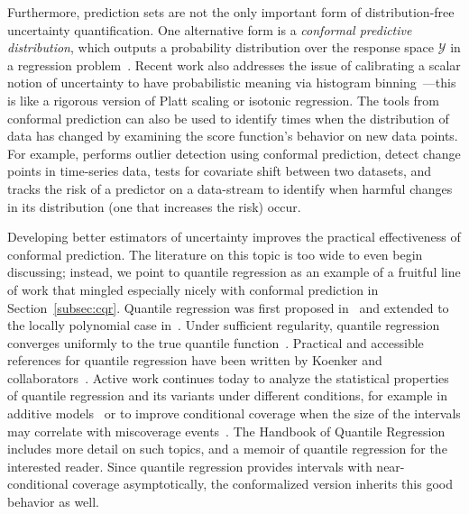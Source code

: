 \documentclass[10pt]{article}
\newcommand{\Y}{\mathcal{Y}}
\begin{document}
Furthermore, prediction sets are not the only important form of distribution-free uncertainty quantification.
One alternative form is a \emph{conformal predictive distribution}, which outputs a probability distribution over the response space $\Y$ in a regression problem~\cite{vovk2017nonparametric}.
Recent work also addresses the issue of calibrating a scalar notion of uncertainty to have probabilistic meaning via histogram binning~\cite{gupta2021distribution, park2021pac}---this is like a rigorous version of Platt scaling or isotonic regression.
The tools from conformal prediction can also be used to identify times when the distribution of data has changed by examining the score function's behavior on new data points.
For example, \cite{bates2021multiple} performs outlier detection using conformal prediction, \cite{vovk2021testing,volkhonskiy2017inductive} detect change points in time-series data, \cite{hu2020distributionfree} tests for covariate shift between two datasets, and \cite{podkopaev2021tracking} tracks the risk of a predictor on a data-stream to identify when harmful changes in its distribution (one that increases the risk) occur.

Developing better estimators of uncertainty improves the practical effectiveness of conformal prediction.
The literature on this topic is too wide to even begin discussing; instead, we point to quantile regression as an example of a fruitful line of work that mingled especially nicely with conformal prediction in Section~\ref{subsec:cqr}.
Quantile regression was first proposed in~\cite{koenker1978regression} and extended to the locally polynomial case in~\cite{chaudhuri1991global}.
Under sufficient regularity, quantile regression converges uniformly to the true quantile function~\cite{chaudhuri1991global,steinwart2011estimating,takeuchi2006nonparametric, zhou1996direct,zhou1998statistical}.
Practical and accessible references for quantile regression have been written by Koenker and collaborators~\cite{koenker2005quantile,koenker2018handbook}.
Active work continues today to analyze the statistical properties of quantile regression and its variants under different conditions, for example in additive models~\cite{koenker2011additive} or to improve conditional coverage when the size of the intervals may correlate with miscoverage events~\cite{feldman2021improving}.
The Handbook of Quantile Regression~\cite{koenker2018handbook} includes more detail on such topics, and a memoir of quantile regression for the interested reader.
Since quantile regression provides intervals with near-conditional coverage asymptotically, the conformalized version inherits this good behavior as well.
\end{document}
